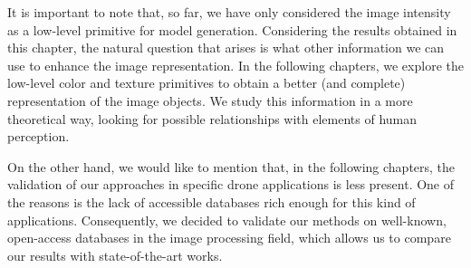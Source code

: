 It is important to note that, so far, we have only considered the image intensity as a low-level primitive for model generation. Considering the results obtained in this chapter, the natural question that arises is what other information we can use to enhance the image representation. In the following chapters, we explore the low-level color and texture primitives to obtain a better (and complete) representation of the image objects. We study this information in a more theoretical way, looking for possible relationships with elements of human perception. 

On the other hand, we would like to mention that, in the following chapters, the validation of our approaches in specific drone applications is less present. One of the reasons is the lack of accessible databases rich enough for this kind of applications. Consequently, we decided to validate our methods on well-known, open-access databases in the image processing field, which allows us to compare our results with state-of-the-art works.


